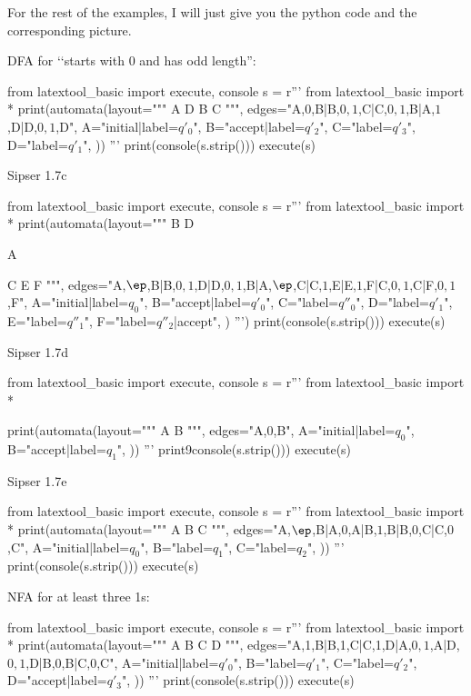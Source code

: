 For the rest of the examples, I will
just give you the python code and the corresponding picture.






DFA for \lq\lq starts with 0 and has odd length'':
\begin{python}
from latextool_basic import execute, console
s = r'''
from latextool_basic import * 
print(automata(layout="""
A D B C
""",
edges="A,$0$,B|B,$0,1$,C|C,$0,1$,B|A,$1$,D|D,$0,1$,D",
A="initial|label=$q'_0$",
B="accept|label=$q'_2$",
C="label=$q'_3$",
D="label=$q'_1$",
))
'''
print(console(s.strip()))
execute(s)
\end{python}




Sipser 1.7c
\begin{python}
from latextool_basic import execute, console
s = r'''
from latextool_basic import * 
print(automata(layout="""
  B  D
  
A

  C  E  F
""",
edges="A,$\ep$,B|B,$0,1$,D|D,$0,1$,B|A,$\ep$,C|C,$1$,E|E,$1$,F|C,$0,1$,C|F,$0,1$,F",
A="initial|label=$q_0$",
B="accept|label=$q'_0$",
C="label=$q''_0$",
D="label=$q'_1$",
E="label=$q''_1$",
F="label=$q''_2$|accept",              
)
''')
print(console(s.strip()))
execute(s)
\end{python}




Sipser 1.7d
\begin{python}
from latextool_basic import execute, console
s = r'''
from latextool_basic import * 

print(automata(layout="""
A B
""",
edges="A,$0$,B",
A="initial|label=$q_0$",
B="accept|label=$q_1$",
))
'''
print9console(s.strip()))
execute(s)
\end{python}





Sipser 1.7e
\begin{python}
from latextool_basic import execute, console
s = r'''
from latextool_basic import * 
print(automata(layout="""
A B C
""",
edges="A,$\ep$,B|A,$0$,A|B,$1$,B|B,$0$,C|C,$0$,C",
A="initial|label=$q_0$",
B="label=$q_1$",
C="label=$q_2$",              
))
'''
print(console(s.strip()))
execute(s)
\end{python}




NFA for at least three 1s:
\begin{python}
from latextool_basic import execute, console
s = r'''
from latextool_basic import * 
print(automata(layout="""
A B C D
""",
edges="A,1,B|B,1,C|C,1,D|A,$0,1$,A|D,$0,1$,D|B,0,B|C,0,C",
A="initial|label=$q'_0$",
B="label=$q'_1$",
C="label=$q'_2$",
D="accept|label=$q'_3$",
))
'''
print(console(s.strip()))
execute(s)
\end{python}



